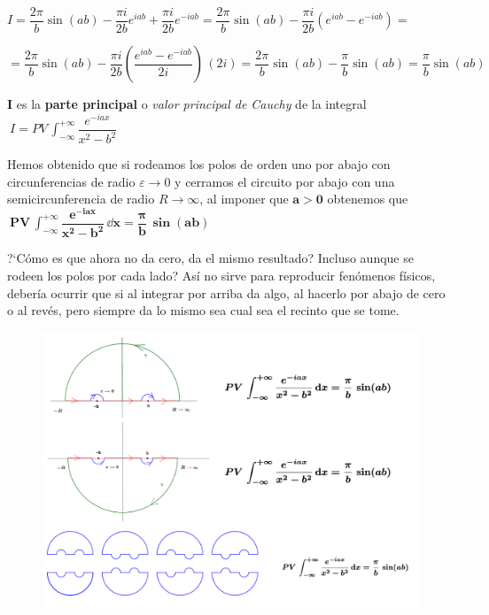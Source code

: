 $I=\dfrac{2\pi}{b} \sin (ab) - \dfrac{\pi i}{2b} e^{iab} + \dfrac{\pi i}{2b} e^{-iab} = \dfrac{2\pi}{b} \sin (ab) - \dfrac{\pi i}{2b} \left( e^{iab} - e^{-iab}  \right) = $

$ = \dfrac{2\pi}{b} \sin (ab) - \dfrac{\pi i}{2b} \left( \dfrac{e^{iab} - e^{-iab}}{2i}  \right)\, (2i)= \dfrac{2\pi}{b} \sin (ab) - \dfrac{\pi}{b} \sin (ab) = \dfrac{\pi}{b} \sin (ab)$

\vspace{15mm} %
$\boldsymbol I$ es la  \textbf{parte principal} o \emph{valor principal de Cauchy} de la integral $\ I=PV\,  \displaystyle \int_{-\infty}^{+\infty} \dfrac{e^{-iax}}{x^2-b^2}   $

Hemos obtenido que si rodeamos los polos de orden uno por abajo con circunferencias de radio $\varepsilon \to 0 $ y cerramos el circuito por abajo con una semicircunferencia de radio $R\to \infty$, al imponer que $\boldsymbol{a>0}$ obtenemos que $\ \displaystyle \boldsymbol{ PV\, \int_{-\infty}^{+\infty} \dfrac{e^{-iax}}{x^2-b^2}  \, \dd x =  \dfrac \pi b \, \sin (ab) } $


\vspace{15mm} %
?`Cómo es que ahora no da cero, da el mismo resultado? Incluso aunque se rodeen los polos por cada lado? Así no sirve para reproducir fenómenos físicos, debería ocurrir que si al integrar por arriba da algo, al hacerlo por abajo de cero o al revés, pero siempre da lo mismo sea cual sea el recinto que se tome.

 \begin{figure}[H]
	\centering
	\includegraphics[width=.85\textwidth]{imagenes/img43-04.png}
 \end{figure}

